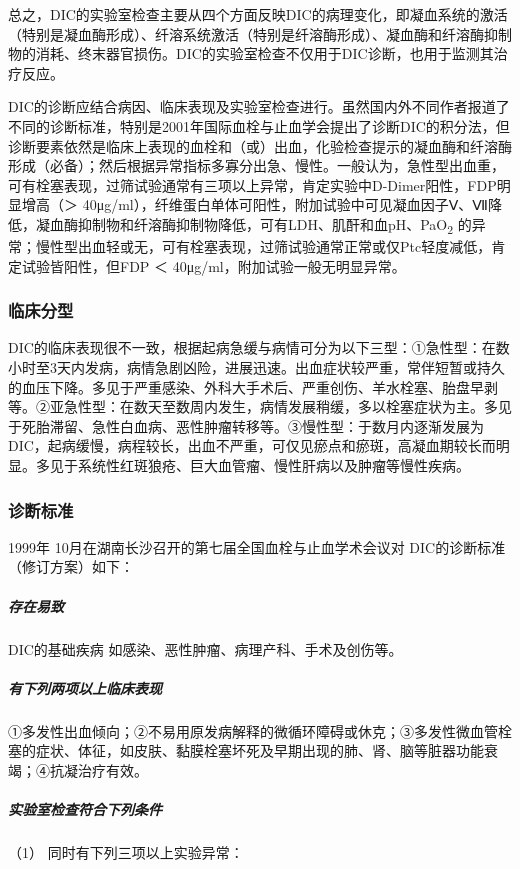 总之，DIC的实验室检查主要从四个方面反映DIC的病理变化，即凝血系统的激活（特别是凝血酶形成）、纤溶系统激活（特别是纤溶酶形成）、凝血酶和纤溶酶抑制物的消耗、终末器官损伤。DIC的实验室检查不仅用于DIC诊断，也用于监测其治疗反应。

DIC的诊断应结合病因、临床表现及实验室检查进行。虽然国内外不同作者报道了不同的诊断标准，特别是2001年国际血栓与止血学会提出了诊断DIC的积分法，但诊断要素依然是临床上表现的血栓和（或）出血，化验检查提示的凝血酶和纤溶酶形成（必备）；然后根据异常指标多寡分出急、慢性。一般认为，急性型出血重，可有栓塞表现，过筛试验通常有三项以上异常，肯定实验中D-Dimer阳性，FDP明显增高（＞
40μg/ml），纤维蛋白单体可阳性，附加试验中可见凝血因子Ⅴ、Ⅶ降低，凝血酶抑制物和纤溶酶抑制物降低，可有LDH、肌酐和血pH、PaO\textsubscript{2}
的异常；慢性型出血轻或无，可有栓塞表现，过筛试验通常正常或仅Ptc轻度减低，肯定试验皆阳性，但FDP
＜ 40μg/ml，附加试验一般无明显异常。

\subsubsection{临床分型}

DIC的临床表现很不一致，根据起病急缓与病情可分为以下三型：①急性型：在数小时至3天内发病，病情急剧凶险，进展迅速。出血症状较严重，常伴短暂或持久的血压下降。多见于严重感染、外科大手术后、严重创伤、羊水栓塞、胎盘早剥等。②亚急性型：在数天至数周内发生，病情发展稍缓，多以栓塞症状为主。多见于死胎滞留、急性白血病、恶性肿瘤转移等。③慢性型：于数月内逐渐发展为DIC，起病缓慢，病程较长，出血不严重，可仅见瘀点和瘀斑，高凝血期较长而明显。多见于系统性红斑狼疮、巨大血管瘤、慢性肝病以及肿瘤等慢性疾病。

\subsubsection{诊断标准}

1999年 10月在湖南长沙召开的第七届全国血栓与止血学术会议对
DIC的诊断标准（修订方案）如下：

\subparagraph{存在易致}

DIC的基础疾病 如感染、恶性肿瘤、病理产科、手术及创伤等。

\subparagraph{有下列两项以上临床表现}

①多发性出血倾向；②不易用原发病解释的微循环障碍或休克；③多发性微血管栓塞的症状、体征，如皮肤、黏膜栓塞坏死及早期出现的肺、肾、脑等脏器功能衰竭；④抗凝治疗有效。

\subparagraph{实验室检查符合下列条件}

\hypertarget{text00087.htmlux5cux23CHP3-9-2-4-3-1}{}
（1） 同时有下列三项以上实验异常：

